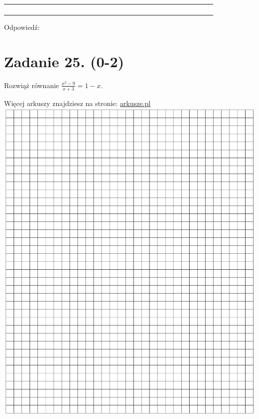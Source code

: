 \documentclass[10pt]{article}
\begin{document}
\begin{center}
\begin{tabular}{|c|c|c|c|c|c|c|c|c|c|c|c|c|c|c|c|c|c|c|c|c|c|c|c|c|c|c|c|c|c|}
\hline
 &  &  &  &  &  &  &  &  &  &  &  &  &  &  &  &  &  &  &  &  &  &  &  &  &  &  &  &  &  \\
\hline
 &  &  &  &  &  &  &  &  &  &  &  &  &  &  &  &  &  &  &  &  &  &  &  &  &  &  &  &  &  \\
\hline
 &  &  &  &  &  &  &  &  &  &  &  &  &  &  &  &  &  &  &  &  &  &  &  &  &  &  &  &  &  \\
\hline
 &  &  &  &  &  &  &  &  &  &  &  &  &  &  &  &  &  &  &  &  &  &  &  &  &  &  &  &  &  \\
\hline
 &  &  &  &  &  &  &  &  &  &  &  &  &  &  &  &  &  &  &  &  &  &  &  &  &  &  &  &  &  \\
\hline
\end{tabular}
\end{center}

Odpowiedź:

\section*{Zadanie 25. (0-2)}
Rozwiąż równanie \(\frac{x^{2}-9}{x+3}=1-x\).

Więcej arkuszy znajdziesz na stronie: \href{http://arkusze.pl}{arkusze.pl}\\
\includegraphics[max width=\textwidth, center]{2024_11_21_4a1915d79134dda0750eg-11}
\end{document}
